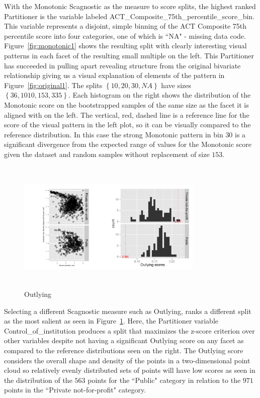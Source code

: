 With the Monotonic Scagnostic as the measure to score splits, the highest ranked Partitioner is the variable labeled ACT\_Composite\_75th\_percentile\_score\_bin. This variable represents a disjoint, simple binning of the ACT Composite 75th percentile score into four categories, one of which is ``NA" - missing data code. Figure~\ref{fig:monotonic1} shows the resulting split with clearly interesting visual patterns in each facet of the resulting small multiple on the left. This Partitioner has succeeded in pulling apart revealing structure from the original bivariate relationship giving us a visual explanation of elements of the pattern in Figure~\ref{fig:original1}. 
The splits $\left\{{10, 20, 30, NA}\right\}$ have sizes $\left\{{36, 1010, 153, 335}\right\}$. Each histogram on the right shows the distribution of the Monotonic score on the bootstrapped samples of the same size as the facet it is aligned with on the left. The vertical, red, dashed line is a reference line for the score of the visual pattern in the left plot, so it can be visually compared to the reference distribution. In this case the strong Monotonic pattern in bin $30$ is a significant divergence from the expected range of values for the Monotonic score given the dataset and random samples without replacement of size $153$.

\begin{figure}
\includegraphics[width=3.5in,height=2.5in]{images/3_0003032851242-Control_of_institution.pdf}
  \caption{Outlying}
 \label{fig:outlying1}
\end{figure}

Selecting a different Scagnostic measure such as Outlying, ranks a different split as the most salient as seen in Figure~\ref{fig:outlying1}. Here, the Partitioner variable Control\_of\_institution produces a split that maximizes the z-score criterion over other variables despite not having a significant Outlying score on any facet as compared to the reference distributions seen on the right. The Outlying score considers the overall shape and density of the points in a two-dimensional point cloud so relatively evenly distributed sets of points will have low scores as seen in the distribution of the $563$ points for the ``Public" category in relation to the $971$ points in the ``Private not-for-profit" category.

